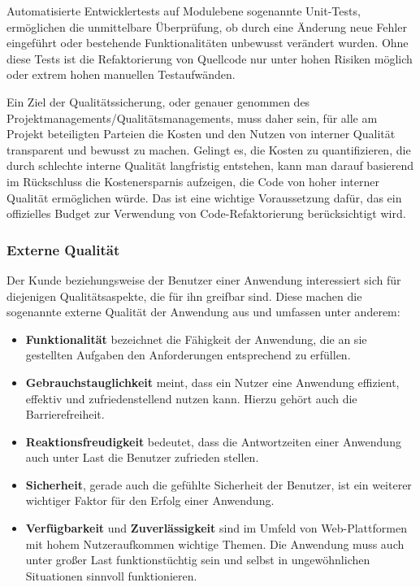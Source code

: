 Automatisierte Entwicklertests auf Modulebene sogenannte Unit-Tests, ermöglichen die unmittelbare Überprüfung, ob durch eine Änderung neue Fehler eingeführt oder bestehende Funktionalitäten unbewusst verändert wurden. Ohne diese Tests ist die Refaktorierung von Quellcode nur unter hohen Risiken möglich oder extrem hohen manuellen Testaufwänden.

Ein Ziel der Qualitätssicherung, oder genauer genommen des Projektmanagements/Qualitätsmanagements, muss daher sein, für alle am Projekt beteiligten Parteien die Kosten und den Nutzen von interner Qualität transparent und bewusst zu machen. Gelingt es, die Kosten zu quantifizieren, die durch schlechte interne Qualität langfristig entstehen, kann man darauf basierend im Rückschluss die Kostenersparnis aufzeigen, die Code von hoher interner Qualität ermöglichen würde. Das ist eine wichtige Voraussetzung dafür, das ein offizielles Budget zur Verwendung von Code-Refaktorierung berücksichtigt wird.

\subsubsection{Externe Qualität}
Der Kunde beziehungsweise der Benutzer einer Anwendung interessiert sich für diejenigen Qualitätsaspekte, die für ihn greifbar sind. Diese machen die sogenannte externe Qualität
der Anwendung aus und umfassen unter anderem: %
\begin{itemize}
	\item \textbf{Funktionalität} bezeichnet die Fähigkeit der Anwendung, die an sie gestellten Aufgaben den Anforderungen entsprechend zu erfüllen.
	
	\item \textbf{Gebrauchstauglichkeit} meint, dass ein Nutzer eine Anwendung effizient, effektiv und zufriedenstellend nutzen kann. Hierzu gehört auch die Barrierefreiheit.

	\item \textbf{Reaktionsfreudigkeit} bedeutet, dass die Antwortzeiten einer Anwendung auch unter Last die Benutzer zufrieden stellen. 

	\item \textbf{Sicherheit}, gerade auch die gefühlte Sicherheit der Benutzer, ist ein weiterer wichtiger Faktor für den Erfolg einer Anwendung.

	\item \textbf{Verfügbarkeit} und \textbf{Zuverlässigkeit} sind im Umfeld von Web-Plattformen mit hohem Nutzeraufkommen wichtige Themen. Die Anwendung muss auch unter großer Last funktionstüchtig sein und selbst in ungewöhnlichen Situationen sinnvoll funktionieren.
\end{itemize}

